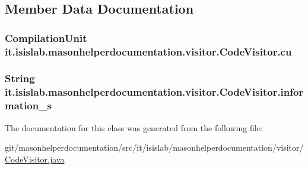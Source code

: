 \subsection{Member Data Documentation}
\hypertarget{classit_1_1isislab_1_1masonhelperdocumentation_1_1visitor_1_1_code_visitor_af9088f73f92fd3640698ad4e660f042b}{
\subsubsection[{cu}]{\setlength{\rightskip}{0pt plus 5cm}Compilation\-Unit it.\-isislab.\-masonhelperdocumentation.\-visitor.\-Code\-Visitor.\-cu\hspace{0.3cm}{\ttfamily [private]}}}\label{classit_1_1isislab_1_1masonhelperdocumentation_1_1visitor_1_1_code_visitor_af9088f73f92fd3640698ad4e660f042b}
\hypertarget{classit_1_1isislab_1_1masonhelperdocumentation_1_1visitor_1_1_code_visitor_a8bfc263e47218ff87b62a5ad9b1294e7}{
\subsubsection[{information\-\_\-s}]{\setlength{\rightskip}{0pt plus 5cm}String it.\-isislab.\-masonhelperdocumentation.\-visitor.\-Code\-Visitor.\-information\-\_\-s\hspace{0.3cm}{\ttfamily [private]}}}\label{classit_1_1isislab_1_1masonhelperdocumentation_1_1visitor_1_1_code_visitor_a8bfc263e47218ff87b62a5ad9b1294e7}


The documentation for this class was generated from the following file\-:\begin{DoxyCompactItemize}
\item 
git/masonhelperdocumentation/src/it/isislab/masonhelperdocumentation/visitor/\hyperlink{_code_visitor_8java}{Code\-Visitor.\-java}\end{DoxyCompactItemize}
